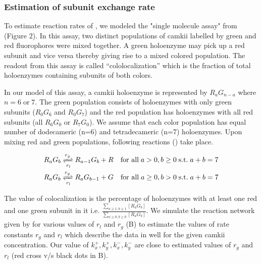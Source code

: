 \documentclass[9pt,lineno,doublespacing]{elife}
\begin{document}
{%
\subsubsection{Estimation of subunit exchange rate}\label{subsec:estimate_exchange_rate}

To estimate reaction rates of , we modeled the "single molecule
assay" from \cite{stratton_activation-triggered_2014} (Figure 2). In this assay,
two distinct populations of \gls{camkii} labelled by green and red fluorophores
were mixed together. A green holoenzyme may pick up a red subunit and vice versa
thereby giving rise to a mixed colored population. The readout from this assay
is called ``cololocalization'' which is the fraction of total holoenzymes
containing subunits of both colors.

In our model of this assay, a \gls{camkii} holoenzyme is represented by
$R_aG_{n-a}$ where $n=6\;\text{or}\;7$. The green population consists of
holoenzymes with only green subunits ($R_0G_6$ and $R_0G_7$) and the red
population has holoenzymes with all red subunits (all $R_6G_0$ or $R_7G_0$).  We
assume that each color population has equal number of dodecameric (n=6) and
tetradecameric (n=7) holoenzymes. Upon mixing red and green populations,
following reactions () take place.

\begin{equation}\label{eq:mixing_assay}
    \begin{gathered}
        R_aG_b \xrightleftharpoons[r_l]{r_g} R_{a-1}G_b + R 
        \quad \text{for all}\; a>0,b\ge 0\; \text{s.t.}\; a+b=7 \\
        R_aG_b \xrightleftharpoons[r_l]{r_g} R_{a}G_{b-1} + G 
        \quad \text{for all}\; a\ge 0,b> 0\; \text{s.t.}\; a+b=7
    \end{gathered}
\end{equation}

The value of colocalization is the percentage of holoenzymes with at least one
red and one green subunit in it i.e. $\frac{\sum_{a\ge 1, b \ge 1} [R_aG_b]}{
\sum_{a\ge0,b \ge 0}[R_aG_b]}$. We simulate the reaction network given by
 for various values of $r_l$ and $r_g$
(B) to estimate the values of rate constants
$r_g$ and $r_l$ which describe the data in
\cite{stratton_activation-triggered_2014} well for the given \gls{camkii}
concentration. Our value of $k_x^+, k_y^+, k_x^-, k_y^-$ are close to estimated
values of $r_g$ and $r_l$ (red cross v/s black dots in
B). 

}
\end{document}
